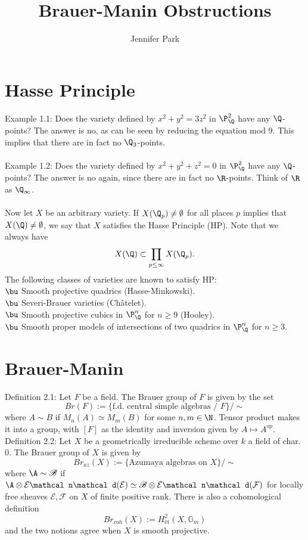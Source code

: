 \documentclass[11pt]{amsart}
\title{Brauer-Manin Obstructions}
\author{Jennifer Park}
\date{}
\numberwithin{equation}{section}
\numberwithin{subsection}{section}
\theoremstyle{definition}
\theoremstyle{remark}
\begin{document}
\maketitle

\section{Hasse Principle}

Example 1.1:  Does the variety defined by $x^2+y^2=3z^2$ in $\P^2_\Q$ have any $\Q$-points?  The answer is no, as can be seen by reducing the equation mod 9.  This implies that there are in fact no $\Q_3$-points.\\\\
Example 1.2:  Does the variety defined by $x^2+y^2+z^2=0$ in $\P^2_\Q$ have any $\Q$-points?  The answer is no again, since there are in fact no $\R$-points.  Think of $\R$ as $\Q_{\infty}$.\\\\
Now let $X$ be an arbitrary variety.  If $X(\Q_p)\neq \emptyset$ for all places $p$ implies that $X(\Q)\neq\emptyset$, we say that $X$ satisfies the Hasse Principle (HP).  Note that we always have 
$$X(\Q)\subset \prod_{p\leq\infty} X(\Q_p).$$
The following classes of varieties are known to satisfy HP:\\

$\bu$ Smooth projective quadrics (Hasse-Minkowski).\\
$\bu$ Severi-Brauer varieties (Ch\^{a}telet).\\
$\bu$ Smooth projective cubics in $\P^n_\Q$ for $n\geq 9$ (Hooley).\\
$\bu$ Smooth proper models of intersections of two quadrics in $\P^n_\Q$ for $n\geq 3$.\\

\section{Brauer-Manin}

Definition 2.1:  Let $F$ be a field.  The Brauer group of $F$ is given by the set
$$Br(F) := \{\text{f.d. central simple algebras / }F\}/\sim$$
where $A\sim B$ if $M_n(A)\simeq M_m(B)$ for some $n,m\in \N$.  Tensor product makes it into a group, with $[F]$ as the identity and inversion given by $A\mapsto A^{op}$.\\

Definition 2.2:  Let $X$ be a geometrically irreducible scheme over $k$ a field of char. 0.  The Brauer group of $X$ is given by
$$Br_{az}(X) := \{\text{Azumaya algebras on } X\}/\sim$$
where $\A\sim \mathscr B$ if $\A\otimes \mathcal E\mathcal n\mathcal d(\mathcal E) \simeq \mathscr B \otimes \mathcal E\mathcal n \mathcal d(\mathcal F)$ for locally free sheaves $\mathcal E, \mathcal F$ on $X$ of finite positive rank.  There is also a cohomological definition
$$Br_{coh}(X) := H^2_{\text{\'{e}t}}(X,\mathbb G_m)$$
and the two notions agree when $X$ is smooth projective.\\
\end{document}
